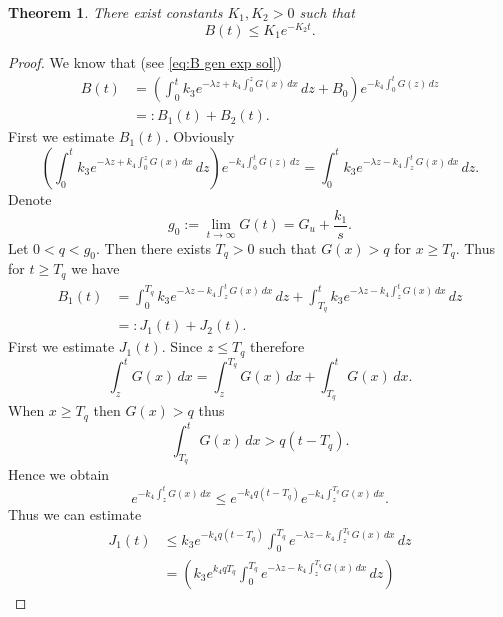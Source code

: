 \documentclass[pdflatex,sn-mathphys-num]{sn-jnl}
\theoremstyle{thmstyleone}
\newtheorem{theorem}{Theorem}[section]
\theoremstyle{thmstyletwo}
\theoremstyle{thmstylethree}
\begin{document}
\begin{theorem}\label{thm:Bt_est}
There exist constants $K_1,K_2>0$ such that 
\begin{equation*}
B(t)\leq K_1 e^{-K_2t}.
\end{equation*}
\end{theorem}

\begin{proof}
We know that (see \eqref{eq:B gen exp sol}) 
\begin{align}\label{eq:I1I2}
B(t) &=\left(
\int_0^t k_3 e^{-\lambda z +k_4 \int_0^z G(x)\,dx}
\,dz+
B_0
\right)e^{-k_4 \int_0^t G(z)\,dz} \nonumber \\
&=:B_1(t)+B_2(t).
\end{align}
First we estimate $B_1(t)$. Obviously
\begin{equation*}
\left(\int_0^t k_3 e^{-\lambda z +k_4 \int_0^z G(x)\,dx}
\,dz\right) e^{-k_4 \int_0^t G(z)\,dz}=\int_0^t k_3 e^{-\lambda z -k_4 \int_z^t G(x)\,dx}
\,dz.
\end{equation*}
Denote
\begin{equation*}
g_0:=\lim_{t\to\infty} G(t)=G_u+\frac{k_1}{s}.
\end{equation*}
Let $0<q<g_0$. Then there exists $T_q>0$ such that $G(x)> q$ for $x\geq T_q$. Thus for $t\geq T_q$ we 
have
\begin{align}\label{eq:J1J2}
B_1(t) &= \int_0^{T_q} k_3 e^{-\lambda z -k_4 \int_z^t G(x)\,dx}
\,dz+\int_{T_q}^t k_3 e^{-\lambda z -k_4 \int_z^t G(x)\,dx}\,dz \nonumber \\
&=:J_1(t)+J_2(t).
\end{align}
First we estimate $J_1(t)$. Since $z\leq T_q$ therefore
\begin{equation*}
\int_z^t G(x)\,dx=\int_z^{T_q} G(x)\,dx+\int_{T_q}^t G(x)\,dx.
\end{equation*}
When $x\geq T_q$ then $G(x)>q$ thus
\begin{equation*}
\int_{T_q}^t G(x)\,dx>q(t-T_q).
\end{equation*}
Hence we obtain 
\begin{equation*}
e^{-k_4\int_z^t G(x)\,dx}\leq e^{-k_4 q(t-T_q)} e^{-k_4\int_z^{T_q} G(x)\,dx}.
\end{equation*}
Thus we can estimate 
\begin{align}\label{eq:J1_est}
J_1(t) &\leq k_3 e^{-k_4 q(t-T_q)}\int_0^{T_q} e^{-\lambda z-k_4\int_z^{T_q} G(x)\,dx}\,dz\nonumber \\
&=\left(k_3 e^{k_4 qT_q } \int_0^{T_q} e^{-\lambda z -k_4 \int_z^{T_q} G(x)\,dx}\,dz \right)

\end{align}
\end{proof}
\end{document}
